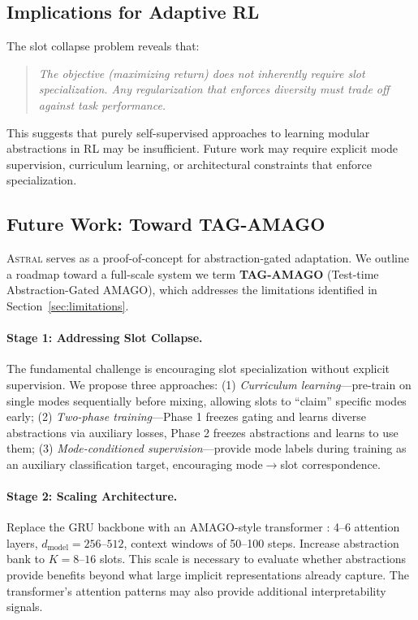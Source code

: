 \documentclass{article}
\newcommand{\astral}{\textsc{Astral}}
\newcommand{\method}{\astral}
\begin{document}
\subsection{Implications for Adaptive RL}

The slot collapse problem reveals that:

\begin{quote}
\emph{The objective (maximizing return) does not inherently require slot specialization. Any regularization that enforces diversity must trade off against task performance.}
\end{quote}

This suggests that purely self-supervised approaches to learning modular abstractions in RL may be insufficient. Future work may require explicit mode supervision, curriculum learning, or architectural constraints that enforce specialization.

\subsection{Future Work: Toward TAG-AMAGO}
\label{sec:future}

\method{} serves as a proof-of-concept for abstraction-gated adaptation. We outline a roadmap toward a full-scale system we term \textbf{TAG-AMAGO} (Test-time Abstraction-Gated AMAGO), which addresses the limitations identified in Section~\ref{sec:limitations}.

\paragraph{Stage 1: Addressing Slot Collapse.} The fundamental challenge is encouraging slot specialization without explicit supervision. We propose three approaches: (1) \emph{Curriculum learning}---pre-train on single modes sequentially before mixing, allowing slots to ``claim'' specific modes early; (2) \emph{Two-phase training}---Phase 1 freezes gating and learns diverse abstractions via auxiliary losses, Phase 2 freezes abstractions and learns to use them; (3) \emph{Mode-conditioned supervision}---provide mode labels during training as an auxiliary classification target, encouraging mode$\to$slot correspondence.

\paragraph{Stage 2: Scaling Architecture.} Replace the GRU backbone with an AMAGO-style transformer \citep{grigsby2024amago}: 4--6 attention layers, $d_{\text{model}}=256$--$512$, context windows of 50--100 steps. Increase abstraction bank to $K=8$--$16$ slots. This scale is necessary to evaluate whether abstractions provide benefits beyond what large implicit representations already capture. The transformer's attention patterns may also provide additional interpretability signals.
\end{document}
